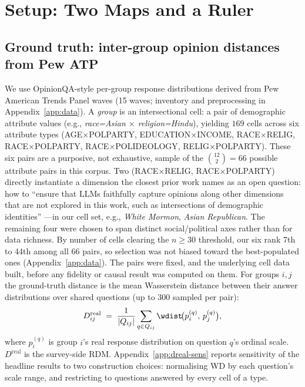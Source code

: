 \section{Setup: Two Maps and a Ruler}
\label{sec:setup}

\subsection{Ground truth: inter-group opinion distances from Pew ATP}
We use OpinionQA-style per-group response distributions derived from Pew
American Trends Panel waves \citep{opinionqa2023, subpop2025} (15 waves;
inventory and preprocessing in Appendix~\ref{app:data}). A \emph{group} is an intersectional cell: a pair
of demographic attribute values (e.g., \textit{race=Asian $\times$
religion=Hindu}), yielding $169$ cells across six attribute types
(AGE$\times$POLPARTY, EDUCATION$\times$INCOME, RACE$\times$RELIG,
RACE$\times$POLPARTY, RACE$\times$POLIDEOLOGY, RELIG$\times$POLPARTY).
These six pairs are a purposive, not exhaustive, sample of the
$\binom{12}{2}=66$ possible attribute pairs in this corpus. Two
(RACE$\times$RELIG, RACE$\times$POLPARTY) directly instantiate a
dimension the closest prior work names as an open question: how to
``ensure that LLMs faithfully capture opinions along other dimensions
that are not explored in this work, such as intersections of demographic
identities'' \citep[p.~9]{subpop2025}---in our cell set, e.g.,
\textit{White Mormon}, \textit{Asian Republican}. The remaining four were
chosen to span distinct social/political axes rather than for data
richness. By number of cells clearing the $n\geq30$ threshold, our six
rank 7th to 44th among all 66 pairs, so selection was not biased toward
the best-populated ones (Appendix~\ref{app:data}). The
pairs were fixed, and the underlying cell data built, before any
fidelity or causal result was computed on them.
For groups $i,j$ the ground-truth distance is the mean Wasserstein
distance between their answer distributions over shared questions
(up to 300 sampled per pair):
\begin{equation}
D^{\mathrm{real}}_{ij} \;=\; \frac{1}{|Q_{ij}|}\sum_{q\in Q_{ij}}
\wdist\!\big(p_i^{(q)},\, p_j^{(q)}\big),
\end{equation}
where $p_i^{(q)}$ is group $i$'s real response distribution on question
$q$'s ordinal scale. $D^{\mathrm{real}}$ is the survey-side RDM.
Appendix~\ref{app:dreal-sens} reports sensitivity of the headline results
to two construction choices: normalising WD by each question's scale
range, and restricting to questions answered by every cell of a type.

